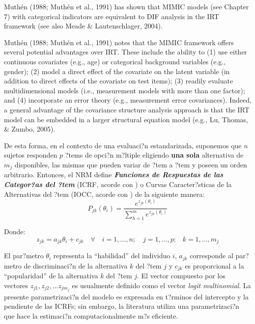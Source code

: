 Muthén (1988; Muthén et al., 1991) has shown that MIMIC models (see Chapter 7) with categorical indicators are equivalent to DIF analysis in the IRT framework (see also Meade & Lautenschlager, 2004).

Muthén (1988; Muthén et al., 1991) notes that the MIMIC framework offers several potential advantages over IRT. These include the ability to (1) use either continuous covariates (e.g., age) or categorical background  variables (e.g., gender); (2) model a direct effect of the covariate on the latent variable (in addition to direct effects of the covariate on test items); (3) readily  evaluate multidimensional models (i.e., measurement models with more than one factor); and (4) incorporate an error theory (e.g., measurement error covariances). Indeed, a general advantage of the covariance structure analysis approach is that the IRT model can be  embedded in a larger structural equation model (e.g., Lu, Thomas, & Zumbo, 2005).


De esta forma, en el contexto de una evaluaci?n estandarizada, suponemos que $n$ sujetos responden $p$ ?tems de opci?n m?ltiple eligiendo \textbf{una sola} alternativa de $m_j$ disponibles, las mismas que pueden variar de ?tem a ?tem y poseen un orden arbitrario. Entonces, el NRM define \textbf{\textit{Funciones de Respuestas de las Categor?as del ?tem}} (ICRF, acorde con \citealp{Ostini2006}) o Curvas Caracter?sticas de la Alternativas del ?tem (IOCC, acorde con \citealp{Ham_Swam1991}) de la siguiente manera:
\begin{equation}
	P_{jk}(\theta_i) = \dfrac{e^{z_{jk}(\theta_i)}}{\sum_{h=1}^{m}e^{z_{jh}(\theta_i)}} 
\end{equation}

Donde:
\begin{equation*}
z_{jk} = a_{jk}\theta_i + c_{jk} \quad \forall \quad i = 1, \dots, n; \quad j = 1, \dots, p \text{;} \quad k = 1, \dots, m_j
\end{equation*}

El par?metro $\theta_i$ representa la ``habilidad'' del individuo $i$, $a_{jk}$ corresponde al par?metro de discriminaci?n de la alternativa $k$ del ?tem $j$ y $c_{jk}$ es proporcional a la ``popularidad'' de la alternativa $k$ del ?tem $j$. El vector compuesto por los vectores $z_{j1}, z_{j2}, \dots z_{j m_j}$ es usualmente definido como el vector \textit{logit multinomial}. La presente parametrizaci?n del modelo es expresada en t?rminos del intercepto y la pendiente de las ICRFs; sin embargo, la literatura utiliza una parametrizaci?n que hace la estimaci?n computacionalmente m?s eficiente.



